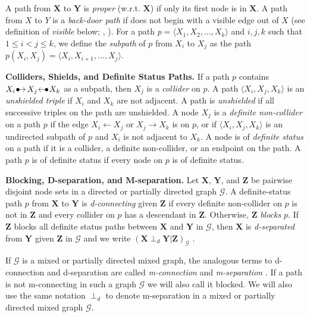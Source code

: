 \documentclass[twoside]{article}
\newcommand{\mb}[1]{\mathbf{#1}}
\newcommand{\dsepp}{\perp_{d}}
\newcommand{\g}[1][G]{\mathcal{#1}}
\newcommand{\bulletarrow}{
  \setlength{\unitlength}{1mm}
  \begin{picture}(5,1)(0,0)
    \put(0.2,0){$\bullet$}
    \put(1,0){$\rightarrow$}
  \end{picture}
}
\newcommand{\arrowbullet}{
  \setlength{\unitlength}{1mm}
  \begin{picture}(5,1)(0,0)
    \put(0.2,0){$\leftarrow$}
    \put(3,0){$\bullet$}
  \end{picture}
}
\begin{document}
A path from $\mb{X}$ to $\mb{Y}$ is \textit{proper} (w.r.t. $\mb{X}$) if only its first node is in $\mb{X}$. A path from $X$ to $Y$ is a \textit{back-door path} if does not begin with a visible edge out of $X$ (see definition of \textit{visible} below; \citealp{pearl2009causality}, \citealp{maathuis2015generalized}). For a path $p = \langle X_1, X_2, \dots, X_k \rangle$ and $i,j,k$ such that $1 \le i < j \le k$, we define the \textit{subpath} of $p$ from $X_i$ to $X_j$ as the path $p(X_i,X_j) = \langle X_i,X_{i+1},\dots,X_j \rangle$.

\textbf{Colliders, Shields, and Definite Status Paths.}
If a path $p$ contains $X_i \bulletarrow X_j \arrowbullet X_k$ as a subpath, then $X_j$ is a \textit{collider} on $p$. A path $\langle X_{i},X_{j},X_{k} \rangle$ is an \textit{unshielded triple} if $X_{i}$ and $X_{k}$ are not adjacent. A path is \textit{unshielded} if all successive triples on the path are unshielded. A node $X_{j}$ is a \textit{definite non-collider} on a path $p$ if the edge $X_i \leftarrow X_j$ or $X_j \rightarrow X_k$ is on $p$, or if $\langle X_{i}, X_j,X_k \rangle$ is an undirected subpath of $p$ and $X_i$ is not adjacent to $X_k$. A node is of \textit{definite status} on a path if it is a collider, a definite non-collider, or an endpoint on the path. A path $p$ is of definite status if every node on $p$ is of definite status.

\textbf{Blocking, D-separation, and M-separation.}
Let $\mb{X}$, $\mb{Y}$, and $\mb{Z}$ be pairwise disjoint node sets in a directed or partially directed graph $\g$. A definite-status path $p$ from $\mb{X}$ to $\mb{Y}$ is \textit{d-connecting} given $\mb{Z}$ if every definite non-collider on $p$ is not in $\mb{Z}$ and every collider on $p$ has a descendant in $\mb{Z}$. Otherwise, $\mb{Z}$ \textit{blocks} $p$. If $\mb{Z}$ blocks all definite status paths between $\mb{X}$ and $\mb{Y}$ in $\g$, then $\mb{X}$ is \textit{d-separated} from $\mb{Y}$ given $\mb{Z}$ in $\g$ and we write $(\mb{X} \dsepp \mb{Y} | \mb{Z})_{\g}$ \citep{pearl2009causality}.

If $\g$ is a mixed or partially directed mixed graph, the analogous terms to d-connection and d-separation are called \textit{m-connection} and \textit{m-separation} \citep{richardson2002ancestral}. If a path is not m-connecting in such a graph $\g$ we will also call it blocked. We will also use the same notation $\dsepp$ to denote m-separation in a mixed or partially directed mixed graph $\g$.
\end{document}
